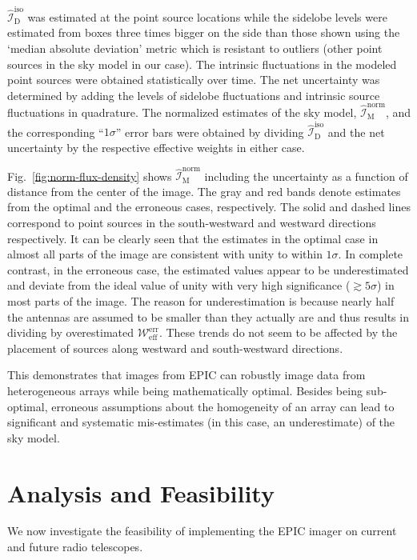 \documentclass[a4paper,fleqn,usenatbib]{mnras}
\begin{document}
$\widehat{\mathcal{I}}_\textrm{D}^\textrm{iso}$ was estimated at the point source locations while the sidelobe levels were estimated from boxes three times bigger on the side than those shown using the `median absolute deviation' metric which is resistant to outliers (other point sources in the sky model in our case). The intrinsic fluctuations in the modeled point sources were obtained statistically over time. The net uncertainty was determined by adding the levels of sidelobe fluctuations and intrinsic source fluctuations in quadrature. The normalized estimates of the sky model, $\widehat{\mathcal{I}}_\textrm{M}^\textrm{norm}$, and the corresponding ``$1\sigma$'' error bars were obtained by dividing $\widehat{\mathcal{I}}_\textrm{D}^\textrm{iso}$ and the net uncertainty by the respective effective weights in either case. 

Fig.~\ref{fig:norm-flux-density} shows $\widehat{\mathcal{I}}_\textrm{M}^\textrm{norm}$ including the uncertainty as a function of distance from the center of the image. The gray and red bands denote estimates from the optimal and the erroneous cases, respectively. The solid and dashed lines correspond to point sources in the south-westward and westward directions respectively. It can be clearly seen that the estimates in the optimal case in almost all parts of the image are consistent with unity to within $1\sigma$. In complete contrast, in the erroneous case, the estimated values appear to be underestimated and deviate from the ideal value of unity with very high significance ($\gtrsim 5\sigma$) in most parts of the image. The reason for underestimation is because nearly half the antennas are assumed to be smaller than they actually are and thus results in dividing by overestimated $\mathcal{W}_\textrm{eff}^\textrm{err}$. These trends do not seem to be affected by the placement of sources along westward and south-westward directions. 

This demonstrates that images from EPIC can robustly image data from heterogeneous arrays while being mathematically optimal. Besides being sub-optimal, erroneous assumptions about the homogeneity of an array can lead to significant and systematic mis-estimates (in this case, an underestimate) of the sky model.

\section{Analysis and Feasibility}\label{sec:analysis}

We now investigate the feasibility of implementing the EPIC imager on current
and future radio telescopes. 
\end{document}
